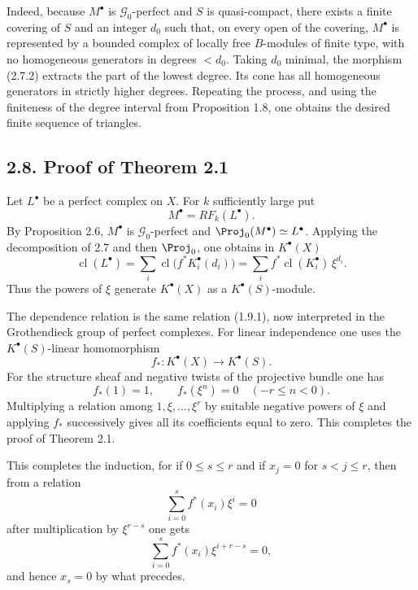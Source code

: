 \documentclass[11pt]{article}
\newcommand{\cl}{\operatorname{cl}}
\providecommand{\GL}{\operatorname{GL}}
\begin{document}
Indeed, because \(M^\bullet\) is \(\mathcal G_0\)-perfect and \(S\) is quasi-compact, there exists a finite covering of \(S\) and an integer \(d_0\) such that, on every open of the covering, \(M^\bullet\) is represented by a bounded complex of locally free \(B\)-modules of finite type, with no homogeneous generators in degrees \(<d_0\). Taking \(d_0\) minimal, the morphism (2.7.2) extracts the part of the lowest degree. Its cone has all homogeneous generators in strictly higher degrees. Repeating the process, and using the finiteness of the degree interval from Proposition 1.8, one obtains the desired finite sequence of triangles.

\subsection*{2.8. Proof of Theorem 2.1}
Let \(L^\bullet\) be a perfect complex on \(X\). For \(k\) sufficiently large put
\[
  M^\bullet=RF_k(L^\bullet).
\]
By Proposition 2.6, \(M^\bullet\) is \(\mathcal G_0\)-perfect and \(\Proj_0(M^\bullet)\simeq L^\bullet\). Applying the decomposition of 2.7 and then \(\Proj_0\), one obtains in \(K^\bullet(X)\)
\[
  \cl(L^\bullet)
  =
  \sum_i \cl\bigl(f^*K_i^\bullet(d_i)\bigr)
  =
  \sum_i f^*\cl(K_i^\bullet)\,\xi^{d_i}.
\]
Thus the powers of \(\xi\) generate \(K^\bullet(X)\) as a \(K^\bullet(S)\)-module.

The dependence relation is the same relation (1.9.1), now interpreted in the Grothendieck group of perfect complexes. For linear independence one uses the \(K^\bullet(S)\)-linear homomorphism
\[
  f_*:K^\bullet(X)\longrightarrow K^\bullet(S).
\]
For the structure sheaf and negative twists of the projective bundle one has
\[
  f_*(1)=1,\qquad f_*(\xi^n)=0\quad(-r\leq n<0).
\]
Multiplying a relation among \(1,\xi,\ldots,\xi^r\) by suitable negative powers of \(\xi\) and applying \(f_*\) successively gives all its coefficients equal to zero. This completes the proof of Theorem 2.1.



\providecommand{\Sym}{\operatorname{Sym}}
\providecommand{\GL}{\operatorname{GL}}
\providecommand{\Grass}{\operatorname{Grass}}
\providecommand{\gr}{\operatorname{gr}}
\providecommand{\ctop}{c_{\mathrm{top}}}
\providecommand{\Rep}{\operatorname{Rep}}
\providecommand{\RZ}{R_{\mathbb Z}}
\providecommand{\Dflag}{D}
\providecommand{\Gmn}{G}


This completes the induction, for if \(0\le s\le r\) and if \(x_j=0\) for \(s<j\le r\), then from a relation
\[
  \sum_{i=0}^{s} f^*(x_i)\xi^i=0
\]
after multiplication by \(\xi^{r-s}\) one gets
\[
  \sum_{i=0}^{s} f^*(x_i)\xi^{i+r-s}=0,
\]
and hence \(x_s=0\) by what precedes.
\end{document}

